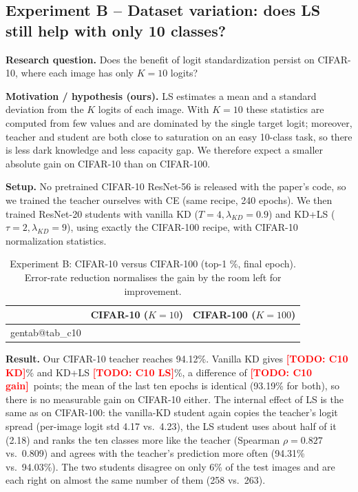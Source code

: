 \documentclass[12pt,a4paper]{article}
\makeatletter
\newcommand{\TODO}[1]{\textcolor{red}{\textbf{[TODO: #1]}}}
\newcommand{\CTENkd}{\TODO{C10 KD}}
\newcommand{\CTENls}{\TODO{C10 LS}}
\newcommand{\CTENgain}{\TODO{C10 gain}}
\newcommand{\gentable}[2]{\csname gentab@#1\endcsname}
\makeatother
\begin{document}
\subsection{Experiment B -- Dataset variation: does LS still help with only 10 classes?}
\textbf{Research question.} Does the benefit of logit standardization persist on CIFAR-10, where each image has only $K=10$ logits?

\textbf{Motivation / hypothesis (ours).} LS estimates a mean and a standard deviation from the $K$ logits of each image. With $K=10$ these statistics are computed from few values and are dominated by the single target logit; moreover, teacher and student are both close to saturation on an easy 10-class task, so there is less dark knowledge and less capacity gap. We therefore expect a smaller absolute gain on CIFAR-10 than on CIFAR-100.

\textbf{Setup.} No pretrained CIFAR-10 ResNet-56 is released with the paper's code, so we trained the teacher ourselves with CE (same recipe, 240 epochs). We then trained ResNet-20 students with vanilla KD ($T=4,\lambda_{KD}=0.9$) and KD+LS ($\tau=2,\lambda_{KD}=9$), using exactly the CIFAR-100 recipe, with CIFAR-10 normalization statistics.

\begin{table}[H]
\centering
\caption{Experiment B: CIFAR-10 versus CIFAR-100 (top-1 \%, final epoch). Error-rate reduction normalises the gain by the room left for improvement.}
\label{tab:c10}
\begin{tabular}{lcc}
\toprule
 & CIFAR-10 ($K{=}10$) & CIFAR-100 ($K{=}100$) \\
\midrule
\gentable{tab_c10}{3}
\bottomrule
\end{tabular}
\end{table}

\textbf{Result.} Our CIFAR-10 teacher reaches 94.12\%. Vanilla KD gives \CTENkd\% and KD+LS \CTENls\%, a difference of \CTENgain\ points; the mean of the last ten epochs is identical (93.19\% for both), so there is no measurable gain on CIFAR-10 either. The internal effect of LS is the same as on CIFAR-100: the vanilla-KD student again copies the teacher's logit spread (per-image logit std 4.17 vs.\ 4.23), the LS student uses about half of it (2.18) and ranks the ten classes more like the teacher (Spearman $\rho=0.827$ vs.\ 0.809) and agrees with the teacher's prediction more often (94.31\% vs.\ 94.03\%). The two students disagree on only 6\% of the test images and are each right on almost the same number of them (258 vs.\ 263).
\end{document}
